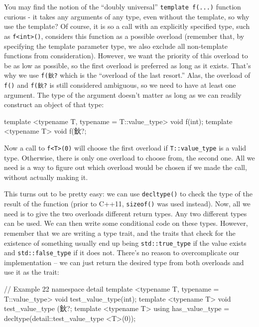 You may find the notion of the ``doubly universal'' \texttt{template\ f(...)} function curious - it takes any arguments of any type, even without the template, so why use the template? Of course, it is so a call with an explicitly specified type, such as \texttt{f\textless{}int\textgreater{}()}, considers this function as a possible overload (remember that, by specifying the template parameter type, we also exclude all non-template functions from consideration). However, we want the priority of this overload to be as low as possible, so the first overload is preferred as long as it exists. That's why we use \texttt{f(鈥?} which is the ``overload of the last resort.'' Alas, the overload of \texttt{f()} and \texttt{f(鈥?} is still considered ambiguous, so we need to have at least one argument. The type of the argument doesn't matter as long as we can readily construct an object of that type:

\begin{code}
template <typename T, typename = T::value_type>
void f(int);
template <typename T> void f(鈥?;
\end{code}

Now a call to \texttt{f\textless{}T\textgreater{}(0)} will choose the first overload if \texttt{T::value\_type} is a valid type. Otherwise, there is only one overload to choose from, the second one. All we need is a way to figure out which overload would be chosen if we made the call, without actually making it.

This turns out to be pretty easy: we can use \texttt{decltype()} to check the type of the result of the function (prior to C++11, \texttt{sizeof()} was used instead). Now, all we need is to give the two overloads different return types. Any two different types can be used. We can then write some conditional code on these types. However, remember that we are writing a type trait, and the traits that check for the existence of something usually end up being \texttt{std::true\_type} if the value exists and \texttt{std::false\_type} if it does not. There's no reason to overcomplicate our implementation -- we can just return the desired type from both overloads and use it as the trait:

\begin{code}
// Example 22
namespace detail {
template <typename T, typename = T::value_type>
void test_value_type(int);
template <typename T> void test_value_type (鈥?;
}
template <typename T> using has_value_type =
  decltype(detail::test_value_type <T>(0));
\end{code}

